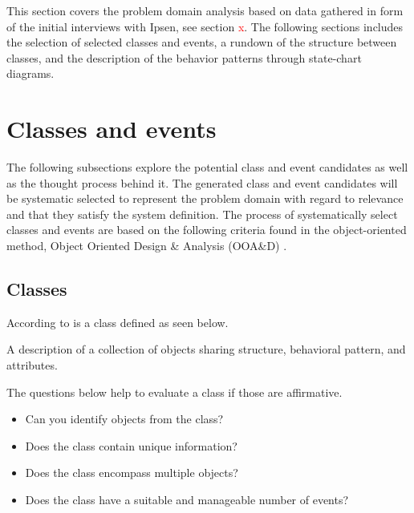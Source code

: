 This section covers the problem domain analysis based on data gathered in form of the initial interviews with Ipsen, see section \textcolor{red}{x}.
The following sections includes the selection of selected classes and events, a rundown of the structure between classes, and the description of the behavior patterns through state-chart diagrams.

\section{Classes and events}
The following subsections explore the potential class and event candidates as well as the thought process behind it.
The generated class and event candidates will be systematic selected to represent the problem domain with regard to relevance and that they satisfy the system definition.
The process of systematically select classes and events are based on the following criteria found in the object-oriented method, Object Oriented Design \& Analysis (OOA\&D) \cite{Rod-Aalborg} .

\subsection{Classes} \label{sec:Classes}
According to  \citep[p.~55]{Rod-Aalborg} is a class defined as seen below.
\begin{defn}\label{defn:class}
	A description of a collection of objects sharing structure, behavioral pattern, and attributes.	
\end{defn}


The questions below help to evaluate a class if those are affirmative. \citep[p.~62]{Rod-Aalborg}
\begin{itemize}
	\item Can you identify objects from the class?
	\item Does the class contain unique information?
	\item Does the class encompass multiple objects?
	\item Does the class have a suitable and manageable number of events?
\end{itemize}

